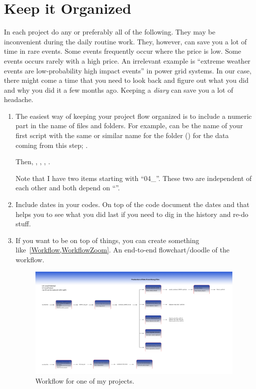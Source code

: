 \chapter{Keep it Organized}
\label{chap:KeepitOrganized}


In each project do any or preferably all of 
the following. They may be inconvenient during
the daily routine work. They, however, can save you 
a lot of time in rare events. Some events
frequently occur where the price is low. Some events
occurs rarely with a high price.
An irrelevant example is ``extreme weather events are 
low-probability high impact events'' in power grid systems.
In our case, there might come a time that you need
to look back and figure out what you did and why you did
it a few months ago. Keeping a \emph{diary} can save you 
a lot of headache.
\begin{enumerate}
\item The easiest way of keeping your project flow organized is to 
include a numeric part in the name of files and folders.
For example,  can be the name
of your first script with the same or similar name for the folder 
() for the data coming from this step; . 

Then, ,
, ,
.

Note that I have two items starting with ``04\_''. 
These two are independent of each other
and both depend on ``''.

\item Include dates in your codes. On top of the code
document the dates and that helps you to see what you did last
if you need to dig in the history and re-do stuff.

\item If you want to be on top of things, you can create 
something like~\cref{Workflow,WorkflowZoom}. An end-to-end 
flowchart/doodle of the workflow.

\begin{figure}[htb]
  \centering
  \includegraphics[width=1\textwidth]{figures/pipe_Line}
  \caption{Workflow for one of my projects.}
  \label{Workflow}
\end{figure}


\end{enumerate}
